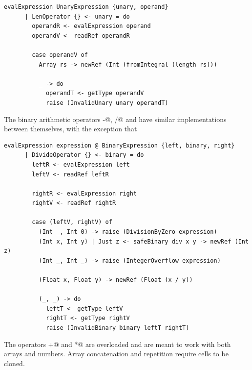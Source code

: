 \documentclass[UdineBachThesis,american,11pt,draft]{PhdThesis}
\begin{document}
  \begin{lstlisting}[gobble=4,basicstyle=\ttfamily\small]
    evalExpression UnaryExpression {unary, operand}
      | LenOperator {} <- unary = do
        operandR <- evalExpression operand
        operandV <- readRef operandR

        case operandV of
          Array rs -> newRef (Int (fromIntegral (length rs)))

          _ -> do
            operandT <- getType operandV
            raise (InvalidUnary unary operandT)
  \end{lstlisting}

  The binary arithmetic operators \lstinline@-@, \lstinline@/@ and \lstinline@%@
  have similar implementations between themselves, with the exception that
  \lstinline@%@ supports only \lstinline@Int@s, and that both \lstinline@/@ and
  \lstinline@%@ raise an exception if the dividend is 0.

  \begin{lstlisting}[gobble=4,basicstyle=\ttfamily\small]
    evalExpression expression @ BinaryExpression {left, binary, right}
      | DivideOperator {} <- binary = do
        leftR <- evalExpression left
        leftV <- readRef leftR

        rightR <- evalExpression right
        rightV <- readRef rightR

        case (leftV, rightV) of
          (Int _, Int 0) -> raise (DivisionByZero expression)
          (Int x, Int y) | Just z <- safeBinary div x y -> newRef (Int z)
          (Int _, Int _) -> raise (IntegerOverflow expression)

          (Float x, Float y) -> newRef (Float (x / y))

          (_, _) -> do
            leftT <- getType leftV
            rightT <- getType rightV
            raise (InvalidBinary binary leftT rightT)
  \end{lstlisting}

  The operators \lstinline@+@ and \lstinline@*@ are overloaded and are meant to
  work with both arrays and numbers. Array concatenation and repetition require
  cells to be cloned.
\end{document}
